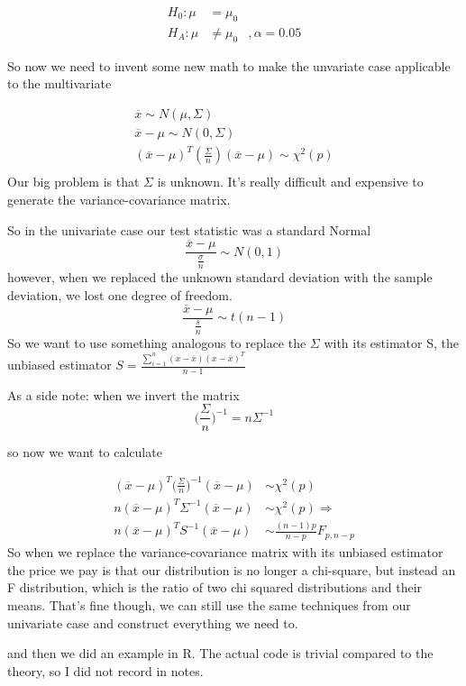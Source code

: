 \begin{align*}
    H_0: \mu &= \mu_0 \\
    H_A: \mu &\neq \mu_0  &, \alpha = 0.05
\end{align*}

So now we need to invent some new math to make the unvariate case applicable to the multivariate

\begin{gather*}
    \overline{x} \sim N(\mu,\Sigma)\\
    \overline{x}-\mu \sim N(0,\Sigma)\\
    (\overline{x}-\mu)^T(\frac{\Sigma}{n})(\overline{x}-\mu) \sim \chi^2(p)\\
\end{gather*}
Our big problem is that $\Sigma$ is unknown. It's really difficult and expensive to generate the variance-covariance matrix.

So in the univariate case our test statistic was a standard Normal
\[\frac{\overline{x}-\mu}{\frac{\sigma}{n}}\sim N(0,1)\]
however, when we replaced the unknown standard deviation with the sample deviation, we lost one degree of freedom.
\[\frac{\overline{x}-\mu}{\frac{s}{n}}\sim t(n-1)\]
So we want to use something analogous to replace the $\Sigma$ with its estimator S, the unbiased estimator $S= \frac{\displaystyle\sum_{i=1}^n(x-\overline{x})(x-\overline{x})^T}{n-1}$

As a side note: 
when we invert the matrix
\[\big( \frac{\Sigma}{n}\big)^{-1} = n\Sigma^{-1}\]

so now we want to calculate 

\begin{align*}
    (\overline{x}-\mu)^T \bigg(\frac{\Sigma}{n} \bigg)^{-1}(\overline{x}-\mu) &\sim \chi^2(p) \\
    n(\overline{x}-\mu)^T {\Sigma}^{-1}(\overline{x}-\mu) &\sim \chi^2(p) \Rightarrow\\
    n(\overline{x}-\mu)^T S^{-1}(\overline{x}-\mu) &\sim \frac{(n-1)p}{n-p}F_{p,n-p}
\end{align*}
So when we replace the variance-covariance matrix with its unbiased estimator the price we pay is that our distribution is no longer a chi-square, but instead an F distribution, which is the ratio of two chi squared distributions and their means. 
That's fine though, we can still use the same techniques from our univariate case and construct everything we need to. 

and then we did an example in R. The actual code is trivial compared to the theory, so I did not record in notes.